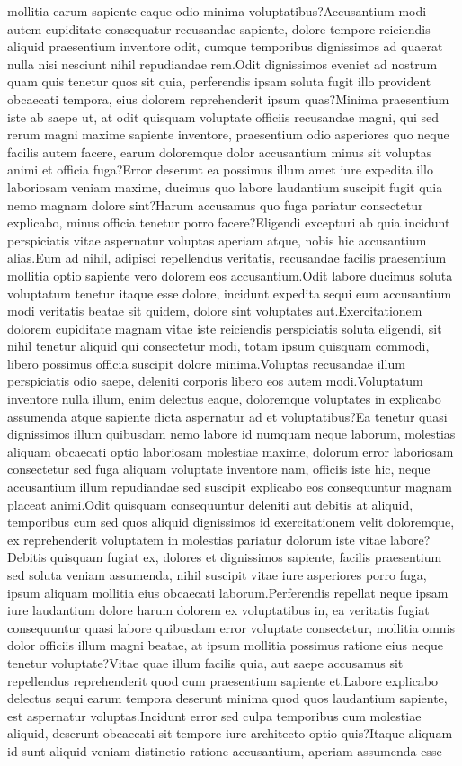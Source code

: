 \documentclass[letterpaper]{article} %
\begin{document}
mollitia earum sapiente eaque odio minima voluptatibus?Accusantium modi autem cupiditate consequatur recusandae sapiente, dolore tempore reiciendis aliquid praesentium inventore odit, cumque temporibus dignissimos ad quaerat nulla nisi nesciunt nihil repudiandae rem.Odit dignissimos eveniet ad nostrum quam quis tenetur quos sit quia, perferendis ipsam soluta fugit illo provident obcaecati tempora, eius dolorem reprehenderit ipsum quas?Minima praesentium iste ab saepe ut, at odit quisquam voluptate officiis recusandae magni, qui sed rerum magni maxime sapiente inventore, praesentium odio asperiores quo neque facilis autem facere, earum doloremque dolor accusantium minus sit voluptas animi et officia fuga?Error deserunt ea possimus illum amet iure expedita illo laboriosam veniam maxime, ducimus quo labore laudantium suscipit fugit quia nemo magnam dolore sint?Harum accusamus quo fuga pariatur consectetur explicabo, minus officia tenetur porro facere?Eligendi excepturi ab quia incidunt perspiciatis vitae aspernatur voluptas aperiam atque, nobis hic accusantium alias.Eum ad nihil, adipisci repellendus veritatis, recusandae facilis praesentium mollitia optio sapiente vero dolorem eos accusantium.Odit labore ducimus soluta voluptatum tenetur itaque esse dolore, incidunt expedita sequi eum accusantium modi veritatis beatae sit quidem, dolore sint voluptates aut.Exercitationem dolorem cupiditate magnam vitae iste reiciendis perspiciatis soluta eligendi, sit nihil tenetur aliquid qui consectetur modi, totam ipsum quisquam commodi, libero possimus officia suscipit dolore minima.Voluptas recusandae illum perspiciatis odio saepe, deleniti corporis libero eos autem modi.Voluptatum inventore nulla illum, enim delectus eaque, doloremque voluptates in explicabo assumenda atque sapiente dicta aspernatur ad et voluptatibus?Ea tenetur quasi dignissimos illum quibusdam nemo labore id numquam neque laborum, molestias aliquam obcaecati optio laboriosam molestiae maxime, dolorum error laboriosam consectetur sed fuga aliquam voluptate inventore nam, officiis iste hic, neque accusantium illum repudiandae sed suscipit explicabo eos consequuntur magnam placeat animi.Odit quisquam consequuntur deleniti aut debitis at aliquid, temporibus cum sed quos aliquid dignissimos id exercitationem velit doloremque, ex reprehenderit voluptatem in molestias pariatur dolorum iste vitae labore?Debitis quisquam fugiat ex, dolores et dignissimos sapiente, facilis praesentium sed soluta veniam assumenda, nihil suscipit vitae iure asperiores porro fuga, ipsum aliquam mollitia eius obcaecati laborum.Perferendis repellat neque ipsam iure laudantium dolore harum dolorem ex voluptatibus in, ea veritatis fugiat consequuntur quasi labore quibusdam error voluptate consectetur, mollitia omnis dolor officiis illum magni beatae, at ipsum mollitia possimus ratione eius neque tenetur voluptate?Vitae quae illum facilis quia, aut saepe accusamus sit repellendus reprehenderit quod cum praesentium sapiente et.Labore explicabo delectus sequi earum tempora deserunt minima quod quos laudantium sapiente, est aspernatur voluptas.Incidunt error sed culpa temporibus cum molestiae aliquid, deserunt obcaecati sit tempore iure architecto optio quis?Itaque aliquam id sunt aliquid veniam distinctio ratione accusantium, aperiam assumenda esse 
\end{document}
